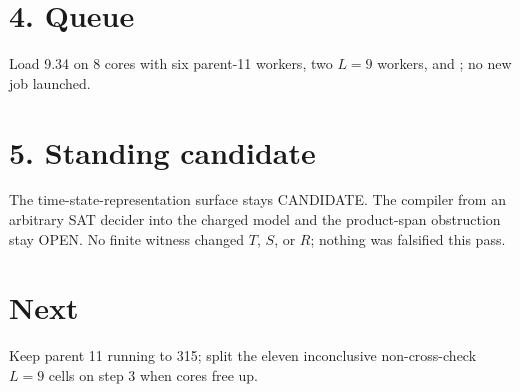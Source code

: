 \documentclass[11pt]{article}
\begin{document}
\section*{4. Queue}
Load 9.34 on 8 cores with six parent-11 workers, two $L=9$ workers, and ; no new job launched.

\section*{5. Standing candidate}
The time-state-representation surface stays CANDIDATE. The compiler from an arbitrary SAT decider into the charged model and the product-span obstruction stay OPEN. No finite witness changed $T$, $S$, or $R$; nothing was falsified this pass.

\section*{Next}
Keep parent 11 running to 315; split the eleven inconclusive non-cross-check $L=9$ cells on step 3 when cores free up.
\end{document}
